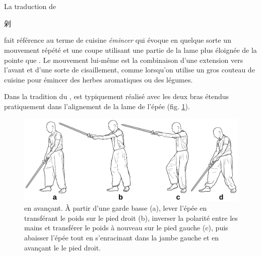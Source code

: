 \section{\Duo}
La traduction de \Duo{} \begin{CJK*}{UTF8}{bsmi}剁\end{CJK*} fait référence au terme de cuisine \textit{émincer} qui évoque en quelque sorte un mouvement répété et une coupe utilisant une partie de la lame plus éloignée de la pointe que \Pi{}. Le mouvement lui-même est la combinaison d'une extension vers l'avant et d'une sorte de cisaillement, comme lorsqu'on utilise un gros couteau de cuisine pour émincer des herbes aromatiques ou des légumes.

Dans la tradition du \Yangjia{} \Michuan{}, \Duo{} est typiquement réalisé avec les deux bras étendus pratiquement dans l'alignement de la lame de l'épée (fig. \ref{fig:duo_full}). 


\begin{figure}[ht]
	\centering
	
	\includegraphics[width=1.00\textwidth]{../../Images/JibenJianfa/Duo/Duo.pdf}
	\caption[\Duo{} en avançant]{\Duo{} en avançant. À partir d'une garde basse (a), lever l'épée en transférant le poids sur le pied droit (b), inverser la polarité entre les mains et transférer le poids à nouveau sur le pied gauche (c), puis abaisser l'épée tout en s'enracinant dans la jambe gauche et en avançant le le pied droit.}
	\label{fig:duo_full}
\end{figure} 

